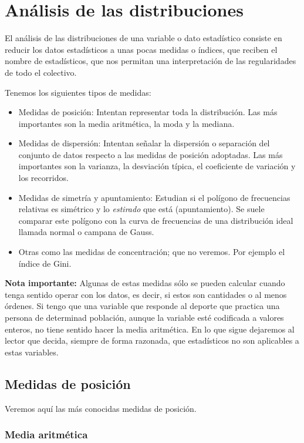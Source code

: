 \documentclass[12pt]{report}
\begin{document}
\section{Análisis de las distribuciones}

El análisis de las distribuciones de una variable o dato estadístico consiste en reducir
los datos estadísticos a unas pocas medidas o índices, que reciben el nombre de
estadísticos, que nos permitan una interpretación de las regularidades de todo el
colectivo.

Tenemos los siguientes tipos de medidas:
\begin{itemize}
\item Medidas de posición:
Intentan representar toda la distribución. Las más importantes son la media aritmética,
la moda y la mediana.
\item Medidas de dispersión: Intentan se\~{n}alar la
dispersión o separación del conjunto de datos respecto a las medidas de posición
 adoptadas. Las más importantes son la varianza,
la desviación típica, el coeficiente de variación  y los recorridos.
\item Medidas de simetría y apuntamiento: Estudian si el  polígono de frecuencias relativas
es simétrico y lo \emph{estirado} que está (apuntamiento). Se suele comparar este
polígono con la curva de frecuencias de una distribución ideal llamada normal o campana
de Gauss.
\item Otras como las medidas de concentración; que no veremos. Por ejemplo el índice de Gini.
\end{itemize}

\textbf{Nota importante:} Algunas de estas medidas sólo se pueden calcular cuando tenga
sentido operar con los datos, es decir, si estos son cantidades o al menos órdenes. Si
tengo que una variable que responde al deporte que practica una persona de determinad
población, aunque la variable esté codificada a valores enteros, no tiene sentido hacer
la media aritmética. En lo que sigue dejaremos al lector que decida, siempre de forma razonada, que estadísticos no son
aplicables a estas variables.

\subsection{Medidas de posición}
Veremos aquí las más conocidas medidas de posición.

\subsubsection{Media aritmética}
\end{document}
